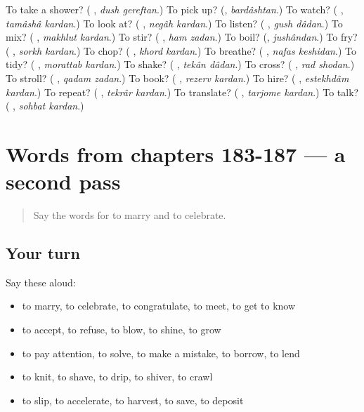 \begin{tcolorbox}[breakable,colback=teal!4,colframe=teal!35!black,title={Before you move on}]
To take a shower? (\textbf{ }, \emph{dush gereftan}.) To pick up? (\textbf{}, \emph{bardâshtan}.) To watch? (\textbf{ }, \emph{tamâshâ kardan}.) To look at? (\textbf{ }, \emph{negâh kardan}.) To listen? (\textbf{ }, \emph{gush dâdan}.) To mix? (\textbf{ }, \emph{makhlut kardan}.) To stir? (\textbf{ }, \emph{ham zadan}.) To boil? (\textbf{}, \emph{jushândan}.) To fry? (\textbf{ }, \emph{sorkh kardan}.) To chop? (\textbf{ }, \emph{khord kardan}.) To breathe? (\textbf{ }, \emph{nafas keshidan}.) To tidy? (\textbf{ }, \emph{morattab kardan}.) To shake? (\textbf{ }, \emph{tekân dâdan}.) To cross? (\textbf{ }, \emph{rad shodan}.) To stroll? (\textbf{ }, \emph{qadam zadan}.) To book? (\textbf{ }, \emph{rezerv kardan}.) To hire? (\textbf{ }, \emph{estekhdâm kardan}.) To repeat? (\textbf{ }, \emph{tekrâr kardan}.) To translate? (\textbf{ }, \emph{tarjome kardan}.) To talk? (\textbf{ }, \emph{sohbat kardan}.)
\end{tcolorbox}
\section[(dialogue)]{Words from chapters 183-187 — a second pass}

\label{lesson:FA-R187-second-pass-words-from-chapters-183-187}



\begin{quote}
Say the words for to marry and to celebrate.
\end{quote}

\subsection*{Your turn}
Say these aloud:

\begin{itemize}
\raggedright
  \item to marry, to celebrate, to congratulate, to meet, to get to know
  \item to accept, to refuse, to blow, to shine, to grow
  \item to pay attention, to solve, to make a mistake, to borrow, to lend
  \item to knit, to shave, to drip, to shiver, to crawl
  \item to slip, to accelerate, to harvest, to save, to deposit
\end{itemize}

